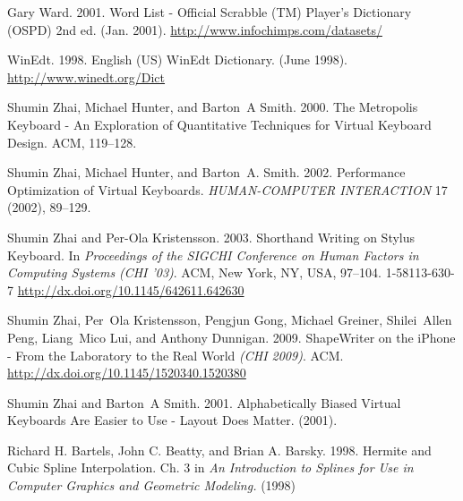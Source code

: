 \documentclass[final,1p,times,authoryear]{elsarticle}
\begin{document}
\begin{thebibliography}{00}
{Gary Ward}. 2001.
Word List - Official Scrabble (TM) Player's
  Dictionary (OSPD) 2nd ed.
(Jan. 2001).
\url{http://www.infochimps.com/datasets/}


{WinEdt}. 1998.
English (US) WinEdt Dictionary.
(June 1998).
\url{http://www.winedt.org/Dict}


{Shumin Zhai}, {Michael Hunter}, {and} {Barton~A Smith}. 2000.
The Metropolis Keyboard - An Exploration of
  Quantitative Techniques for Virtual Keyboard Design. ACM, 119--128.
\newblock


{Shumin Zhai}, {Michael Hunter}, {and} {Barton~A. Smith}. 2002.
Performance Optimization of Virtual Keyboards.
{\em HUMAN-COMPUTER INTERACTION\/}  {17} (2002), 89--129.
\newblock


{Shumin Zhai} {and} {Per-Ola Kristensson}. 2003.
Shorthand Writing on Stylus Keyboard. In {\em
  Proceedings of the SIGCHI Conference on Human Factors in Computing Systems}
  {\em (CHI '03)}. ACM, New York, NY, USA, 97--104.
1-58113-630-7
\url{http://dx.doi.org/10.1145/642611.642630}


{Shumin Zhai}, {Per~Ola Kristensson}, {Pengjun Gong}, {Michael Greiner},
  {Shilei~Allen Peng}, {Liang~Mico Lui}, {and} {Anthony Dunnigan}. 2009.
ShapeWriter on the iPhone - From the Laboratory to
  the Real World {\em (CHI 2009)}. ACM.
\url{http://dx.doi.org/10.1145/1520340.1520380}


{Shumin Zhai} {and} {Barton~A Smith}. 2001.
Alphabetically Biased Virtual Keyboards Are Easier to Use - Layout
  Does Matter.
(2001).


{Richard H. Bartels}, {John C. Beatty}, {and} {Brian A. Barsky}. 1998.
Hermite and Cubic Spline Interpolation. Ch. 3 in
\textit{An Introduction to Splines for Use in Computer Graphics and Geometric Modeling.}
(1998)



\end{thebibliography}
\end{document}
